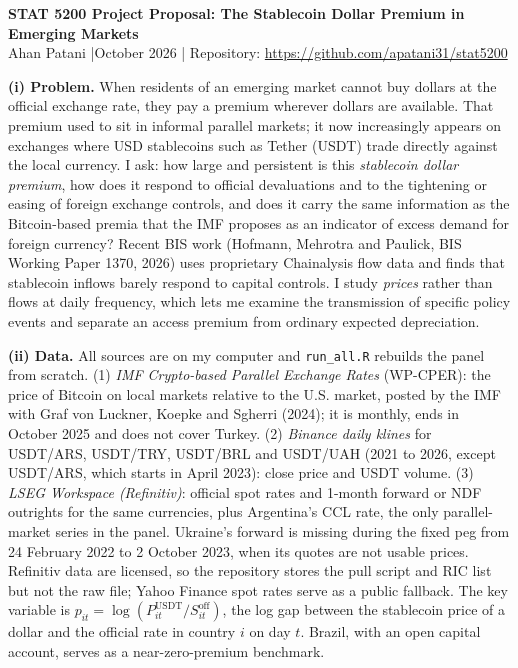 \documentclass[11pt]{article}
\begin{document}
\begin{center}
{\large\bfseries STAT 5200 Project Proposal: The Stablecoin Dollar Premium in Emerging Markets}\\[2pt]
Ahan Patani \quad|\quad October 2026 \quad|\quad
Repository: \url{https://github.com/apatani31/stat5200}
\end{center}

\textbf{(i) Problem.} When residents of an emerging market cannot buy dollars at the official exchange rate, they pay a premium wherever dollars are available. That premium used to sit in informal parallel markets; it now increasingly appears on exchanges where USD stablecoins such as Tether (USDT) trade directly against the local currency. I ask: how large and persistent is this \emph{stablecoin dollar premium}, how does it respond to official devaluations and to the tightening or easing of foreign exchange controls, and does it carry the same information as the Bitcoin-based premia that the IMF proposes as an indicator of excess demand for foreign currency? Recent BIS work (Hofmann, Mehrotra and Paulick, BIS Working Paper 1370, 2026) uses proprietary Chainalysis flow data and finds that stablecoin inflows barely respond to capital controls. I study \emph{prices} rather than flows at daily frequency, which lets me examine the transmission of specific policy events and separate an access premium from ordinary expected depreciation.

\textbf{(ii) Data.} All sources are on my computer and \texttt{run\_all.R} rebuilds the panel from scratch.
(1) \emph{IMF Crypto-based Parallel Exchange Rates} (WP-CPER): the price of Bitcoin on local markets relative to the U.S. market, posted by the IMF with Graf von Luckner, Koepke and Sgherri (2024); it is monthly, ends in October 2025 and does not cover Turkey.
(2) \emph{Binance daily klines} for USDT/ARS, USDT/TRY, USDT/BRL and USDT/UAH (2021 to 2026, except USDT/ARS, which starts in April 2023): close price and USDT volume.
(3) \emph{LSEG Workspace (Refinitiv)}: official spot rates and 1-month forward or NDF outrights for the same currencies, plus Argentina's CCL rate, the only parallel-market series in the panel. Ukraine's forward is missing during the fixed peg from 24 February 2022 to 2 October 2023, when its quotes are not usable prices. Refinitiv data are licensed, so the repository stores the pull script and RIC list but not the raw file; Yahoo Finance spot rates serve as a public fallback.
The key variable is $p_{it}=\log(P^{\text{USDT}}_{it}/S^{\text{off}}_{it})$, the log gap between the stablecoin price of a dollar and the official rate in country $i$ on day $t$. Brazil, with an open capital account, serves as a near-zero-premium benchmark.
\end{document}
